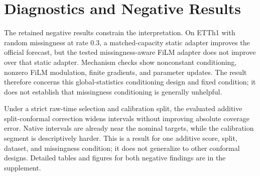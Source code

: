 \section{Diagnostics and Negative Results}
\label{sec:negative-results}

The retained negative results constrain the interpretation. On ETTh1 with random missingness at rate $0.3$, a matched-capacity static adapter improves the official forecast, but the tested missingness-aware FiLM adapter does not improve over that static adapter. Mechanism checks show nonconstant conditioning, nonzero FiLM modulation, finite gradients, and parameter updates. The result therefore concerns this global-statistics conditioning design and fixed condition; it does not establish that missingness conditioning is generally unhelpful.

Under a strict raw-time selection and calibration split, the evaluated additive split-conformal correction widens intervals without improving absolute coverage error. Native intervals are already near the nominal targets, while the calibration segment is descriptively harder. This is a result for one additive score, split, dataset, and missingness condition; it does not generalize to other conformal designs. Detailed tables and figures for both negative findings are in the supplement.

